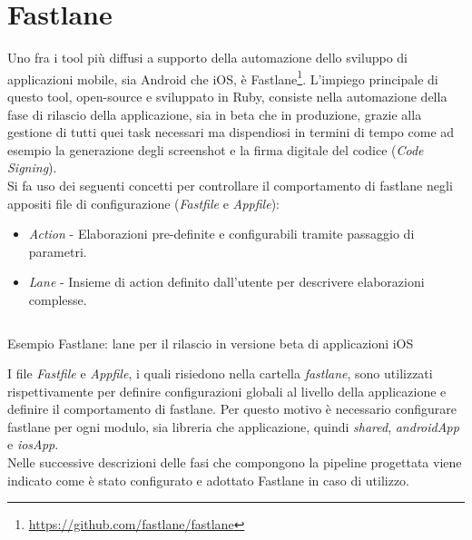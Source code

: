 \section{Fastlane}
Uno fra i tool più diffusi a supporto della automazione dello sviluppo di applicazioni mobile, sia Android che iOS, è Fastlane\footnote{\url{https://github.com/fastlane/fastlane}}. L'impiego principale di questo tool, open-source e sviluppato in Ruby, consiste nella automazione della fase di rilascio della applicazione, sia in beta che in produzione, grazie alla gestione di tutti quei task necessari ma dispendiosi in termini di tempo come ad esempio la generazione degli screenshot e la firma digitale del codice (\textit{Code Signing}).\\
Si fa uso dei seguenti concetti per controllare il comportamento di fastlane negli appositi file di configurazione (\textit{Fastfile} e \textit{Appfile}):
\begin{itemize}
    \item \textit{Action} - Elaborazioni pre-definite e configurabili tramite passaggio di parametri.
    \item \textit{Lane} - Insieme di action definito dall'utente per descrivere elaborazioni complesse.
\end{itemize}

\begin{listing}[H]
\inputminted{ruby}{code/4-fastlane}
\caption{Esempio Fastlane: lane per il rilascio in versione beta di applicazioni iOS}
\end{listing}

I file \textit{Fastfile} e \textit{Appfile}, i quali risiedono nella cartella \textit{fastlane}, sono utilizzati rispettivamente per definire configurazioni globali al livello della applicazione e definire il comportamento di fastlane. Per questo motivo è necessario configurare fastlane per ogni modulo, sia libreria che applicazione, quindi \textit{shared}, \textit{androidApp} e \textit{iosApp}.\\
Nelle successive descrizioni delle fasi che compongono la pipeline progettata viene indicato come è stato configurato e adottato Fastlane in caso di utilizzo. 